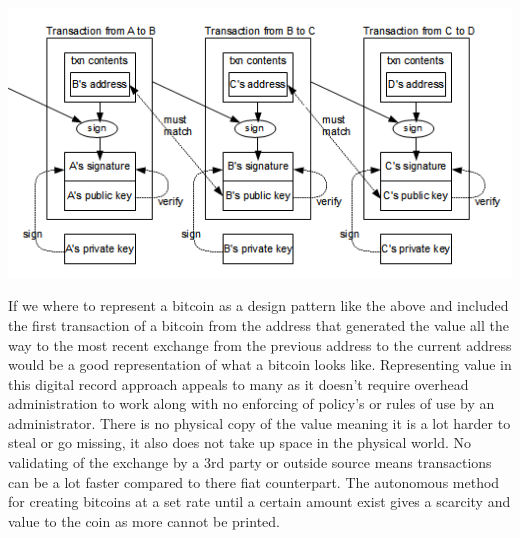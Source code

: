 \includegraphics[scale=0.55]{img/bitcoindesign.png}

If we where to represent a bitcoin as a design pattern like the above and included the first transaction of a bitcoin from the address that generated the value all the way to the most recent exchange from the previous address to the current address would be a good representation of what a bitcoin looks like. Representing value in this digital record approach appeals to many as it doesn't require overhead administration  to work along with no enforcing of policy's or rules of use by an administrator. There is no physical copy of the value meaning it is a lot harder to steal or go missing, it also does not take up space in the physical world. No validating of the exchange by a 3rd party or outside source means transactions can be a lot faster compared to there fiat counterpart. The autonomous method for creating bitcoins at a set rate until a certain amount exist gives a scarcity and value to the coin as more cannot be printed.

